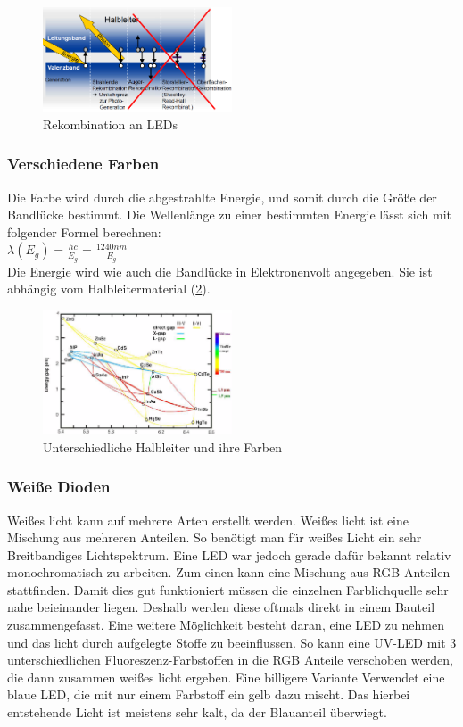	\begin{figure}
		\centering
		\includegraphics[width=0.5\textwidth]{Kapitel/Kap11/rekombination.png}
		\caption{Rekombination an LEDs}
		\label{11_rekombination}
	\end{figure}
	
	\subsubsection{Verschiedene Farben}
	
	Die Farbe wird durch die abgestrahlte Energie, und somit durch die Größe der Bandlücke bestimmt. Die Wellenlänge zu einer bestimmten Energie lässt sich mit folgender Formel berechnen:\\
	$\lambda(E_g) = \frac{hc}{E_g} = \frac{1240nm}{E_g}$\\
	Die Energie wird wie auch die Bandlücke in Elektronenvolt angegeben. Sie ist abhängig vom Halbleitermaterial (\ref{11_farben}).
	
	\begin{figure}
		\centering
		\includegraphics[width=0.5\textwidth]{Kapitel/Kap11/farben.png}
		\caption{Unterschiedliche Halbleiter und ihre Farben}
		\label{11_farben}
	\end{figure}
	
	\subsubsection{Weiße Dioden}
	
	Weißes licht kann auf mehrere Arten erstellt werden. Weißes licht ist eine Mischung aus mehreren Anteilen. So benötigt man für weißes Licht ein sehr Breitbandiges Lichtspektrum. Eine LED war jedoch gerade dafür bekannt relativ monochromatisch zu arbeiten. Zum einen kann eine Mischung aus RGB Anteilen stattfinden. Damit dies gut funktioniert müssen die einzelnen Farblichquelle sehr nahe beieinander liegen. Deshalb werden diese oftmals direkt in einem Bauteil zusammengefasst. Eine weitere Möglichkeit besteht daran, eine LED zu nehmen und das licht durch aufgelegte Stoffe zu beeinflussen. So kann eine UV-LED mit 3 unterschiedlichen Fluoreszenz-Farbstoffen in die RGB Anteile verschoben werden, die dann zusammen weißes licht ergeben. Eine billigere Variante Verwendet eine blaue LED, die mit nur einem Farbstoff ein gelb dazu mischt. Das hierbei entstehende Licht ist meistens sehr kalt, da der Blauanteil überwiegt.

